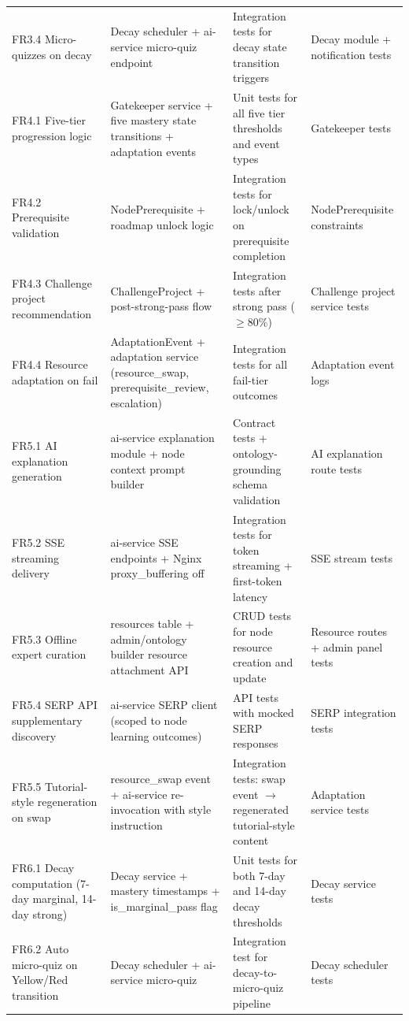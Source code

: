 \begin{longtable}{p{3cm}p{3.5cm}p{3cm}p{4.5cm}}
FR3.4 Micro-quizzes on decay & Decay scheduler + ai-service micro-quiz endpoint & Integration tests for decay state transition triggers & Decay module + notification tests \\
FR4.1 Five-tier progression logic & Gatekeeper service + five mastery state transitions + adaptation events & Unit tests for all five tier thresholds and event types & Gatekeeper tests \\
FR4.2 Prerequisite validation & NodePrerequisite + roadmap unlock logic & Integration tests for lock/unlock on prerequisite completion & NodePrerequisite constraints \\
FR4.3 Challenge project recommendation & ChallengeProject + post-strong-pass flow & Integration tests after strong pass ($\ge 80\%$) & Challenge project service tests \\
FR4.4 Resource adaptation on fail & AdaptationEvent + adaptation service (resource\_swap, prerequisite\_review, escalation) & Integration tests for all fail-tier outcomes & Adaptation event logs \\
FR5.1 AI explanation generation & ai-service explanation module + node context prompt builder & Contract tests + ontology-grounding schema validation & AI explanation route tests \\
FR5.2 SSE streaming delivery & ai-service SSE endpoints + Nginx proxy\_buffering off & Integration tests for token streaming + first-token latency & SSE stream tests \\
FR5.3 Offline expert curation & resources table + admin/ontology builder resource attachment API & CRUD tests for node resource creation and update & Resource routes + admin panel tests \\
FR5.4 SERP API supplementary discovery & ai-service SERP client (scoped to node learning outcomes) & API tests with mocked SERP responses & SERP integration tests \\
FR5.5 Tutorial-style regeneration on swap & resource\_swap event + ai-service re-invocation with style instruction & Integration tests: swap event $\rightarrow$ regenerated tutorial-style content & Adaptation service tests \\
FR6.1 Decay computation (7-day marginal, 14-day strong) & Decay service + mastery timestamps + is\_marginal\_pass flag & Unit tests for both 7-day and 14-day decay thresholds & Decay service tests \\
FR6.2 Auto micro-quiz on Yellow/Red transition & Decay scheduler + ai-service micro-quiz & Integration test for decay-to-micro-quiz pipeline & Decay scheduler tests \\

\end{longtable}
